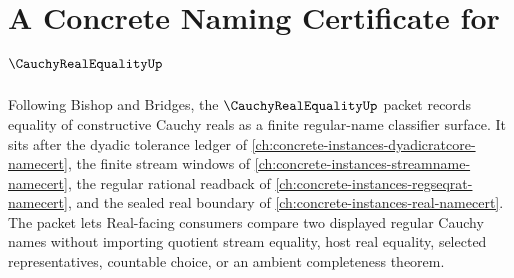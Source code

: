\chapter{A Concrete Naming Certificate for $\CauchyRealEqualityUp$}
\label{ch:concrete-instances-cauchy-real-equality-namecert}

Following Bishop and Bridges, the $\CauchyRealEqualityUp$ packet records equality of constructive Cauchy reals as a finite regular-name classifier surface. It sits after the dyadic tolerance ledger of \autoref{ch:concrete-instances-dyadicratcore-namecert}, the finite stream windows of \autoref{ch:concrete-instances-streamname-namecert}, the regular rational readback of \autoref{ch:concrete-instances-regseqrat-namecert}, and the sealed real boundary of \autoref{ch:concrete-instances-real-namecert}. The packet lets Real-facing consumers compare two displayed regular Cauchy names without importing quotient stream equality, host real equality, selected representatives, countable choice, or an ambient completeness theorem.


